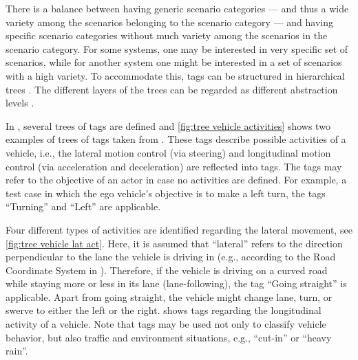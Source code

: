 There is a balance between having generic scenario categories --- and thus a wide variety among the scenarios belonging to the scenario category --- and having specific scenario categories without much variety among the scenarios in the scenario category. For some systems, one may be interested in very specific set of scenarios, while for another system one might be interested in a set of scenarios with a high variety. To accommodate this, tags can be structured in hierarchical trees \cite{molloy2017dynamic, badger2012dynamic}. The different layers of the trees can be regarded as different abstraction levels \cite{Bonnin2014}. 

In \cite{degelder2019scenariocategories}, several trees of tags are defined and \cref{fig:tree vehicle activities} shows two examples of trees of tags taken from \cite{degelder2019scenariocategories}. These tags describe possible activities of a vehicle, i.e., the lateral motion control (via steering) and longitudinal motion control (via acceleration and deceleration) are reflected into tags. The tags may refer to the objective of an actor in case no activities are defined. For example, a test case in which the ego vehicle's objective is to make a left turn, the tags ``Turning'' and ``Left'' are applicable. 

Four different types of activities are identified regarding the lateral movement, see \cref{fig:tree vehicle lat act}. Here, it is assumed that ``lateral'' refers to the direction perpendicular to the lane the vehicle is driving in (e.g., according to the Road Coordinate System in \cite{zofka2015datadrivetrafficscenarios}). Therefore, if the vehicle is driving on a curved road while staying more or less in its lane (lane-following), the tag ``Going straight'' is applicable. Apart from going straight, the vehicle might change lane, turn, or swerve to either the left or the right. 
\cbstartd 
{} shows tags regarding the longitudinal activity of a vehicle. Note that tags may be used not only to classify vehicle behavior, but also traffic and environment situations, e.g., ``cut-in'' or ``heavy rain''.
\cbend
